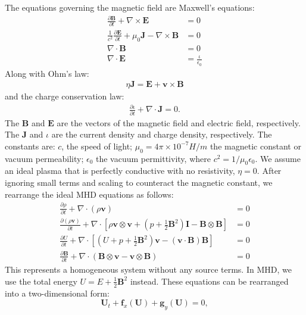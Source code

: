 The equations governing the magnetic field are Maxwell's equations:
\begin{align*}
\frac{\partial \mathbf{B}}{\partial t} + \nabla \times \mathbf{E} &= 0 \\
\frac{1}{c^2}\frac{\partial \mathbf{E}}{\partial t} + \mu_0 \mathbf{J} - \nabla \times \mathbf{B} &= 0 \\
\nabla \cdot \mathbf{B} &= 0 \\
\nabla \cdot \mathbf{E} &= \frac{\iota}{\epsilon_0}
\end{align*}
Along with Ohm's law:
\begin{align*}
\eta \mathbf{J} = \mathbf{E} + \mathbf{v} \times \mathbf{B}
\end{align*}
and the charge conservation law:
\begin{align*}
\frac{\partial \iota}{\partial t} + \nabla \cdot \mathbf{J} = 0.
\end{align*}
The $\mathbf{B}$ and $\mathbf{E}$ are the vectors of the magnetic field and electric field, respectively. The $\mathbf{J}$ and $\iota$ are the current density and charge density, respectively. The constants are: $c$, the speed of light; $\mu_0=4\pi\times10^{-7}H/m$ the magnetic constant or vacuum permeability; $\epsilon_0$ the vacuum permittivity, where $c^2=1/\mu_0\epsilon_0$. We assume an ideal plasma that is perfectly conductive with no resistivity, $\eta=0$. After ignoring small terms and scaling to counteract the magnetic constant, we rearrange the ideal MHD equations as follows:
\begin{align*}
\frac{\partial \rho}{\partial t} + \nabla \cdot (\rho \mathbf{v}) &= 0 \\
\frac{\partial (\rho \mathbf{v})}{\partial t} + \nabla \cdot \left[ \rho \mathbf{v} \otimes \mathbf{v} + \left( p + \frac{1}{2}\mathbf{B}^2 \right) \mathbf{I} - \mathbf{B} \otimes \mathbf{B} \right] &= 0 \\
\frac{\partial U}{\partial t} + \nabla \cdot \left[ \left( U + p + \frac{1}{2}\mathbf{B}^2 \right) \mathbf{v} - (\mathbf{v} \cdot \mathbf{B}) \mathbf{B} \right] &= 0 \\
\frac{\partial \mathbf{B}}{\partial t} + \nabla \cdot (\mathbf{B} \otimes \mathbf{v} - \mathbf{v} \otimes \mathbf{B}) &= 0
\end{align*}
This represents a homogeneous system without any source terms. In MHD, we use the total energy $U=E+\frac{1}{2}\mathbf{B}^2$ instead. These equations can be rearranged into a two-dimensional form:
\begin{equation}
{{\mathbf{U}}_{t}}+\mathbf{f}_x{{(\mathbf{U})}}+\mathbf{g}_y{{(\mathbf{U})}}=0,
\label{MHDsystem}
\end{equation}
